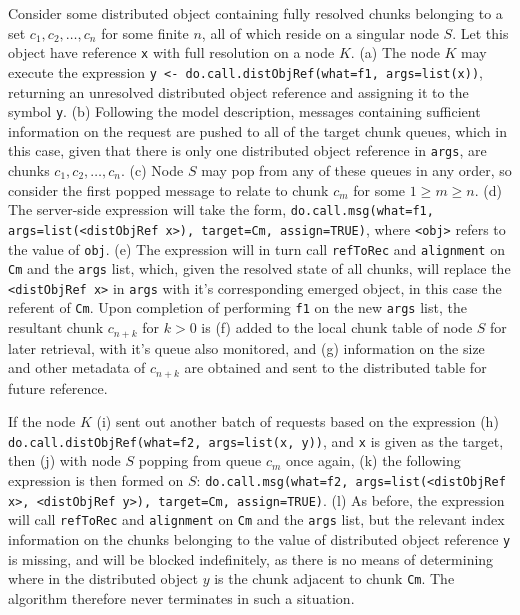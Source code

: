 \documentclass[a4paper,10pt]{article}
\begin{document}
Consider some distributed object containing fully resolved chunks belonging to
a set \({c_1, c_2, \dots, c_n}\) for some finite \(n\), all of which reside on
a singular node \(S\).
Let this object have reference \texttt{x} with full resolution on a node \(K\).
(\textcolor{dark2-1}{a}) The node \(K\) may execute the expression 
\texttt{y <- do.call.distObjRef(what=f1, args=list(x))}, returning an
unresolved distributed object reference and assigning it to the symbol
\texttt{y}.
(\textcolor{dark2-1}{b}) Following the model description, messages containing sufficient information on
the request are pushed to all of the target chunk queues, which in this case,
given that there is only one distributed object reference in \texttt{args}, are
chunks \(c_1, c_2, \dots, c_n\).
(\textcolor{dark2-1}{c}) Node \(S\) may pop from any of these queues in any order, so consider the first
popped message to relate to chunk \(c_m\) for some \(1 \geq m \geq n\).
(\textcolor{dark2-1}{d}) The server-side expression will take the form, 
\texttt{do.call.msg(what=f1, args=list(<distObjRef x>), target=Cm, assign=TRUE)},
where \texttt{<obj>} refers to the value of \texttt{obj}.
(\textcolor{dark2-1}{e}) The expression will in turn call \texttt{refToRec} and
\texttt{alignment} on \texttt{Cm} and the \texttt{args} list,
which, given the resolved state of all chunks, will replace the
\texttt{<distObjRef x>} in \texttt{args} with it's corresponding emerged
object, in this case the referent of \texttt{Cm}.
Upon completion of performing \texttt{f1} on the new \texttt{args} list, the
resultant chunk \(c_{n+k}\) for \(k > 0 \) is (\textcolor{dark2-1}{f}) added to the local chunk table
of node \(S\) for later retrieval, with it's queue also monitored, and (\textcolor{dark2-1}{g})
information on the size and other metadata of \(c_{n+k}\) are obtained and sent
to the distributed table for future reference.

 If the node \(K\) (\textcolor{dark2-2}{i}) sent out another batch of requests
 based on the expression (\textcolor{dark2-2}{h})
\texttt{do.call.distObjRef(what=f2, args=list(x, y))}, and
\texttt{x} is given as the target, then (\textcolor{dark2-2}{j}) with node \(S\) popping from queue
\(c_m\) once again, (\textcolor{dark2-2}{k}) the following expression is then formed on \(S\):
\texttt{do.call.msg(what=f2, args=list(<distObjRef x>, <distObjRef y>), target=Cm, assign=TRUE)}.
(\textcolor{dark2-2}{l}) As before, the expression will call \texttt{refToRec} and
\texttt{alignment} on \texttt{Cm} and the \texttt{args} list,
but the relevant index information on the chunks belonging to the value of
distributed object reference \texttt{y} is missing, and will be blocked
indefinitely, as there is no means of determining where in the distributed
object \(y\) is the chunk adjacent to chunk \texttt{Cm}.
The algorithm therefore never terminates in such a situation.
\end{document}
